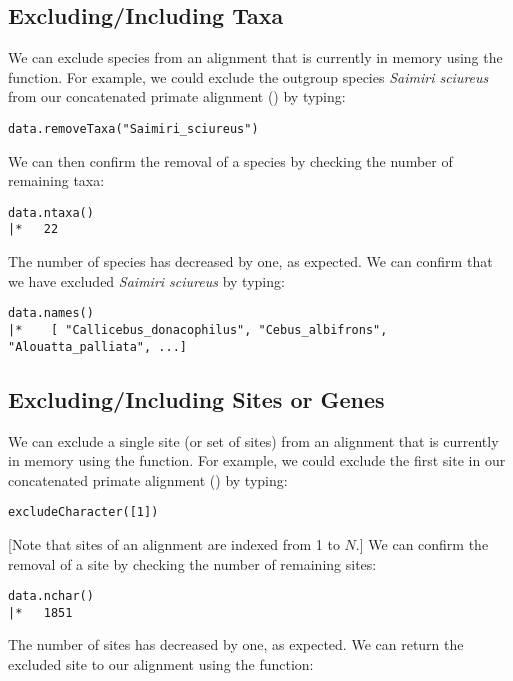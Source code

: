 \subsection{Excluding/Including Taxa}
We can exclude species from an alignment that is currently in memory using the  function.
For example, we could exclude the outgroup species \textit{Saimiri sciureus} from our concatenated primate alignment () by typing:

{\tt \begin{snugshade*}
\begin{lstlisting}
data.removeTaxa("Saimiri_sciureus")
\end{lstlisting}
\end{snugshade*}}

We can then confirm the removal of a species by checking the number of remaining taxa:
{\tt \begin{snugshade*}
\begin{lstlisting}
data.ntaxa()
|*   22
\end{lstlisting}
\end{snugshade*}}
The number of species has decreased by one, as expected.
We can confirm that we have excluded \textit{Saimiri sciureus} by typing:
{\tt \begin{snugshade*}
\begin{lstlisting}
data.names()	
|*    [ "Callicebus_donacophilus", "Cebus_albifrons", "Alouatta_palliata", ...]
\end{lstlisting}
\end{snugshade*}}

\subsection{Excluding/Including Sites or Genes}
We can exclude a single site (or set of sites) from an alignment that is currently in memory using the  function.
For example, we could exclude the first site in our concatenated primate alignment () by typing:

{\tt \begin{snugshade*}
\begin{lstlisting}
excludeCharacter([1])
\end{lstlisting}
\end{snugshade*}}
[Note that sites of an alignment are indexed from 1 to $N$.]
We can confirm the removal of a site by checking the number of remaining sites:

{\tt \begin{snugshade*}
\begin{lstlisting}
data.nchar()
|*   1851
\end{lstlisting}
\end{snugshade*}}
The number of sites has decreased by one, as expected.
We can return the excluded site to our alignment using the  function:

